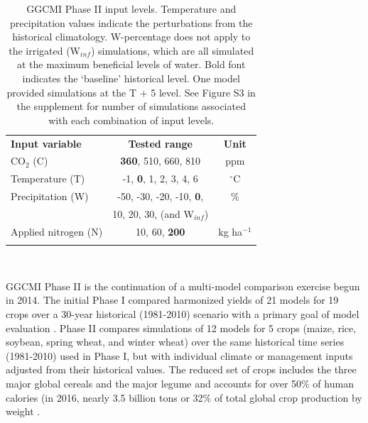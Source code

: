 \documentclass[gmd, manuscript]{copernicus} %
\begin{document}
\begin{table}[t]
\caption{GGCMI Phase II input levels. Temperature and precipitation values indicate the perturbations from the historical climatology. W-percentage does not apply to the irrigated (W$_{inf}$) simulations, which are all simulated at the maximum beneficial levels of water. Bold font indicates the `baseline' historical level. One model provided simulations at the T + 5 level. See Figure S3 in the supplement for number of simulations associated with each combination of input levels.}
\label{table:inputs} 
    \begin{tabular}{lcc} 
        \tophline \vspace{1mm}
        \textbf{Input variable} & \textbf{Tested range} & \textbf{Unit} \\ \middlehline \vspace{1mm}
        CO$_2$ (C) & \textbf{360}, 510, 660, 810 & ppm\\ \middlehline \vspace{1mm}
        Temperature (T) & -1, \textbf{0}, 1, 2, 3, 4, 6 & $^{\circ}$C\\ \middlehline \vspace{1mm}
        Precipitation (W) & -50, -30, -20, -10, \textbf{0}, & \% \\
        {} & 10, 20, 30, (and W$_{inf}$) & {} \\ \middlehline \vspace{1mm}
        Applied nitrogen (N) & 10, 60, \textbf{200} & kg ha$^{-1}$ \\ \bottomhline
    \end{tabular}\\
\end{table}

GGCMI Phase II is the continuation of a multi-model comparison exercise begun in 2014. The initial Phase I compared harmonized yields of 21 models for 19 crops over a 30-year historical (1981-2010) scenario with a primary goal of model evaluation \citep{Elliott2015, muller_global_2017}. Phase II compares simulations of 12 models for 5 crops (maize, rice, soybean, spring wheat, and winter wheat) over the same historical time series (1981-2010) used in Phase I, but with individual climate or management inputs adjusted from their historical values. The reduced set of crops includes the three major global cereals and the major legume and accounts for over 50\% of human calories (in 2016, nearly 3.5 billion tons or 32\% of total global crop production by weight \citep{FAOSTAT}. 
\end{document}

